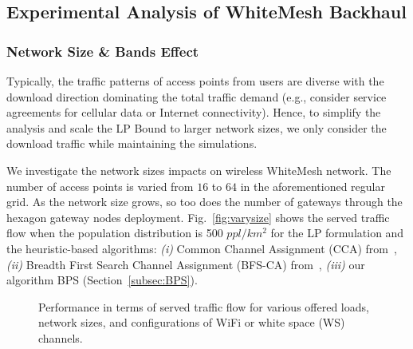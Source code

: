 \subsection{Experimental Analysis of WhiteMesh Backhaul}
\label{subsec:wmanalysis}

\subsubsection{Network Size \& Bands Effect}

Typically, the traffic patterns of access points from users are diverse with
the download direction dominating the total traffic demand (e.g., consider
service agreements for cellular data or Internet connectivity). 
Hence, to simplify the analysis and scale the LP Bound to larger network 
sizes, we only consider the download traffic while maintaining the simulations.

We investigate the network sizes impacts on wireless WhiteMesh network. 
The number of access points is varied from $16$ to $64$ in the aforementioned 
regular grid. As the network size grows, so too does the number of gateways
through the hexagon gateway nodes deployment. Fig.~\ref{fig:varysize} shows 
the served traffic flow when the population distribution is 500 $ppl/km^2$ 
for the LP formulation and the heuristic-based algorithms: 
{\it (i)} Common Channel Assignment (CCA) from~\cite{draves2004routing},
{\it (ii)} Breadth First Search Channel Assignment (BFS-CA) from~\cite{ramachandran2006interference},
{\it (iii)} our algorithm BPS (Section~\ref{subsec:BPS}).


\begin{figure}[t]
\centering
{}
\hfill
\caption{Performance in terms of served traffic flow for various offered loads, network sizes, and configurations of WiFi or white space (WS) channels.}
\label{fig:all3figs}
\vspace{-0.3in}
\end{figure}

